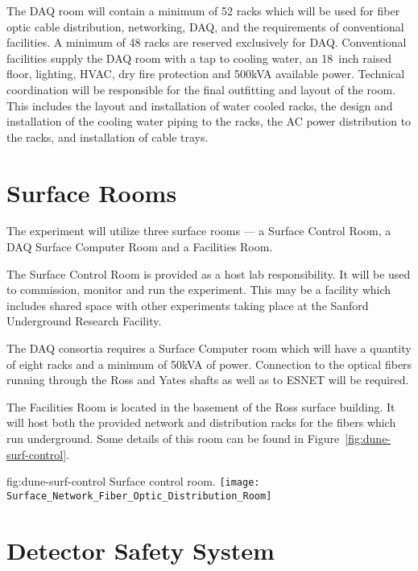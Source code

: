 The DAQ room will contain a minimum of 52 racks which will be used for
fiber optic cable distribution, networking,  DAQ, and the
requirements of conventional facilities.  A minimum of 48 racks are
reserved exclusively for DAQ.  Conventional facilities supply the DAQ
room with a tap to cooling water, an 18~inch raised floor, lighting,
HVAC, dry fire protection and 500kVA available power.  Technical
coordination will be responsible for the final outfitting and layout
of the room.  This includes the layout and installation of water
cooled racks, the design and installation of the cooling water piping
to the racks, the AC power distribution to the racks, and installation
of cable trays.


\section{Surface Rooms}
\label{sec:fdsp-coord-surf-rooms}


The  experiment will utilize three surface rooms --- a Surface
Control Room, a DAQ Surface Computer Room and a Facilities Room.


The  Surface Control Room is provided as a host lab
responsibility.  It will be used to commission, monitor and run the
experiment.  This may be a facility which includes shared space with
other experiments taking place at the Sanford Underground Research
Facility.


The DAQ consortia requires a Surface Computer room which will have a
quantity of eight racks and a minimum of 50kVA of power.  Connection
to the optical fibers running through the Ross and Yates shafts as
well as to ESNET will be required.


The Facilities Room is located in the basement of the Ross surface
building.  It will host both the \fnal provided network and
distribution racks for the fibers which run underground. Some details
of this room can be found in Figure~\ref{fig:dune-surf-control}.
\begin{dunefigure}{fig:dune-surf-control}
  {Surface control room.}
  \texttt{[image: Surface\_Network\_Fiber\_Optic\_Distribution\_Room]}
\end{dunefigure}


\section{ Detector Safety System}
\label{sec:fdsp-coord-det-safety}


